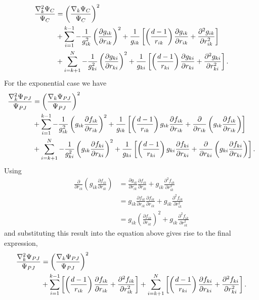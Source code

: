 \begin{align}
 \frac{\nabla_{k}^2 \Psi_C}{\Psi_C} & =  \left(\frac{{\bf \nabla}_k \Psi_C}{\Psi_C}\right)^2 \nonumber\\
 & + \sum_{i=1}^{k-1} -\frac{1}{g_{ik}^2}\left(\frac{\partial g_{ik}}{\partial r_{ik}}\right)^2 + \frac{1}{g_{ik}}\left[\left(\frac{d-1}{r_{ik}}\right)\frac{\partial g_{ik}}{\partial r_{ik}} + \frac{\partial^2 g_{ik}}{\partial r_{ik}^2} \right]\nonumber\\
 & + \sum_{i=k+1}^{N} -\frac{1}{g_{ki}^2}\left(\frac{\partial g_{ki}}{\partial r_{ki}}\right)^2 + \frac{1}{g_{ki}}\left[\left(\frac{d-1}{r_{ki}}\right)\frac{\partial g_{ki}}{\partial r_{ki}} + \frac{\partial^2 g_{ki}}{\partial r_{ki}^2} \right].
\end{align}
For the exponential case we have
\begin{align*}
 \frac{\nabla_{k}^2 \Psi_{PJ}}{\Psi_{PJ}} & =  \left(\frac{{\bf \nabla}_k \Psi_{PJ}}{\Psi_{PJ}}\right)^2 \nonumber\\
 & + \sum_{i=1}^{k-1} -\frac{1}{g_{ik}^2}\left(g_{ik}\frac{\partial f_{ik}}{\partial r_{ik}}\right)^2 + \frac{1}{g_{ik}}\left[\left(\frac{d-1}{r_{ik}}\right)g_{ik}\frac{\partial f_{ik}}{\partial r_{ik}} + \frac{\partial }{\partial r_{ik}}\left(g_{ik}\frac{\partial f_{ik}}{\partial r_{ik}}\right) \right]\nonumber\\
 & + \sum_{i=k+1}^{N} -\frac{1}{g_{ki}^2}\left(g_{ik}\frac{\partial f_{ki}}{\partial r_{ki}}\right)^2 + \frac{1}{g_{ki}}\left[\left(\frac{d-1}{r_{ki}}\right)g_{ki}\frac{\partial f_{ki}}{\partial r_{ki}} + \frac{\partial }{\partial r_{ki}}\left(g_{ki}\frac{\partial f_{ki}}{\partial r_{ki}}\right) \right].
 \end{align*}
Using
\begin{align*}
 \frac{\partial }{\partial r_{ik}}\left(g_{ik}\frac{\partial f_{ik}}{\partial r_{ik}}\right) & = \frac{\partial g_{ik}}{\partial r_{ik}}\frac{\partial f_{ik}}{\partial r_{ik}} + g_{ik}\frac{\partial^2 f_{ik}}{\partial r_{ik}^2}\\
 & = g_{ik}\frac{\partial f_{ik}}{\partial r_{ik}}\frac{\partial f_{ik}}{\partial r_{ik}} + g_{ik}\frac{\partial^2 f_{ik}}{\partial r_{ik}^2}\\
 & = g_{ik}\left(\frac{\partial f_{ik}}{\partial r_{ik}}\right)^2 + g_{ik}\frac{\partial^2 f_{ik}}{\partial r_{ik}^2}
\end{align*}
and substituting this result into the equation above gives rise to the final expression,
\begin{align}\label{lapJasRatio}
\frac{\nabla_{k}^2 \Psi_{PJ}}{\Psi_{PJ}}  &=  \left(\frac{{\bf \nabla}_k \Psi_{PJ}}{\Psi_{PJ}}\right)^2\nonumber\\
  &+ \sum_{i=1}^{k-1} \left[\left(\frac{d-1}{r_{ik}}\right)\frac{\partial f_{ik}}{\partial r_{ik}} + \frac{\partial^2  f_{ik}}{\partial r_{ik}^2} \right]
  + \sum_{i=k+1}^{N} \left[\left(\frac{d-1}{r_{ki}}\right)\frac{\partial f_{ki}}{\partial r_{ki}} + \frac{\partial^2 f_{ki}}{\partial r_{ki}^2} \right].
 \end{align}

